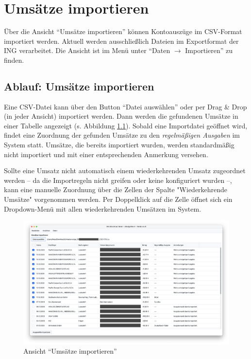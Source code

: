 \chapter{Umsätze importieren} \label{chap:import}

Über die Ansicht "`Umsätze importieren"' können Kontoauszüge im CSV-Format importiert werden. Aktuell werden ausschließlich Dateien im Exportformat der ING verarbeitet. Die Ansicht ist im Menü unter "`Daten $\rightarrow$ Importieren"' zu finden.

\section{Ablauf: Umsätze importieren}

Eine CSV-Datei kann über den Button "`Datei auswählen"' oder per Drag \& Drop (in jeder Ansicht) importiert werden. Dann werden die gefundenen Umsätze in einer Tabelle angezeigt (s. Abbildung \ref{fig:ImportView}). Sobald eine Importdatei geöffnet wird, findet eine Zuordnung der gefunden Umsätze zu den \textit{regelmäßigen Ausgaben} im System statt. Umsätze, die bereits importiert wurden, werden standardmäßig nicht importiert und mit einer entsprechenden Anmerkung versehen.

Sollte eine Umsatz nicht automatisch einem wiederkehrenden Umsatz zugeordnet werden -- da die Importregeln nicht greifen oder keine konfiguriert wurden --, kann eine manuelle Zuordnung über die Zellen der Spalte "Wiederkehrende Umsätze" vorgenommen werden. Per Doppelklick auf die Zelle öffnet sich ein Dropdown-Menü mit allen wiederkehrenden Umsätzen im System.

\begin{figure}[ht!]
	\centering
	\includegraphics[width=\textwidth]{img/Screenshot-ImportView}
	\vspace{-2em}
	\caption{Ansicht "`Umsätze importieren"'}
	\label{fig:ImportView}
\end{figure}

